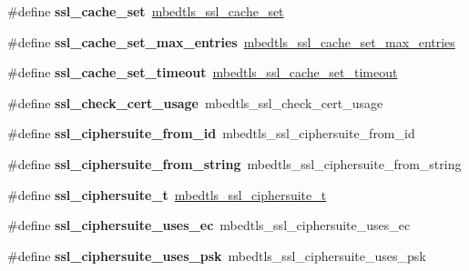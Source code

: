 \begin{DoxyCompactItemize}
\#define {\bfseries ssl\+\_\+cache\+\_\+set}~\mbox{\hyperlink{ssl__cache_8h_a896a81cf3107ba7464e6273970c2c1eb}{mbedtls\+\_\+ssl\+\_\+cache\+\_\+set}}
\item 
\mbox{\label{compat-1_83_8h_a4e237fc67d1d836a5ea1612ab3b4bbdb}} 
\#define {\bfseries ssl\+\_\+cache\+\_\+set\+\_\+max\+\_\+entries}~\mbox{\hyperlink{ssl__cache_8h_abc39c23cf3f791359104d9094bd9cf6f}{mbedtls\+\_\+ssl\+\_\+cache\+\_\+set\+\_\+max\+\_\+entries}}
\item 
\mbox{\label{compat-1_83_8h_a5f27d1d1584f0786ca1bab4ab99c2ac1}} 
\#define {\bfseries ssl\+\_\+cache\+\_\+set\+\_\+timeout}~\mbox{\hyperlink{ssl__cache_8h_aa3468c4ebd9484227436014db30b8f5f}{mbedtls\+\_\+ssl\+\_\+cache\+\_\+set\+\_\+timeout}}
\item 
\mbox{\label{compat-1_83_8h_a1c07da54d0e2c69f53d4409ac1a5ff20}} 
\#define {\bfseries ssl\+\_\+check\+\_\+cert\+\_\+usage}~mbedtls\+\_\+ssl\+\_\+check\+\_\+cert\+\_\+usage
\item 
\mbox{\label{compat-1_83_8h_acf1d72e617143a36bb194f323d5aa173}} 
\#define {\bfseries ssl\+\_\+ciphersuite\+\_\+from\+\_\+id}~mbedtls\+\_\+ssl\+\_\+ciphersuite\+\_\+from\+\_\+id
\item 
\mbox{\label{compat-1_83_8h_aa3514b1e9d02a3f674a25d0a38e9f274}} 
\#define {\bfseries ssl\+\_\+ciphersuite\+\_\+from\+\_\+string}~mbedtls\+\_\+ssl\+\_\+ciphersuite\+\_\+from\+\_\+string
\item 
\mbox{\label{compat-1_83_8h_ad8b5097251c16ca81e91376cd6d05337}} 
\#define {\bfseries ssl\+\_\+ciphersuite\+\_\+t}~\mbox{\hyperlink{structmbedtls__ssl__ciphersuite__t}{mbedtls\+\_\+ssl\+\_\+ciphersuite\+\_\+t}}
\item 
\mbox{\label{compat-1_83_8h_a58ea3a3a1389c6053b5c0c0de58b7b1c}} 
\#define {\bfseries ssl\+\_\+ciphersuite\+\_\+uses\+\_\+ec}~mbedtls\+\_\+ssl\+\_\+ciphersuite\+\_\+uses\+\_\+ec
\item 
\mbox{\label{compat-1_83_8h_a669f514dda87c0cc2ebab447f2e32844}} 
\#define {\bfseries ssl\+\_\+ciphersuite\+\_\+uses\+\_\+psk}~mbedtls\+\_\+ssl\+\_\+ciphersuite\+\_\+uses\+\_\+psk

\end{DoxyCompactItemize}
